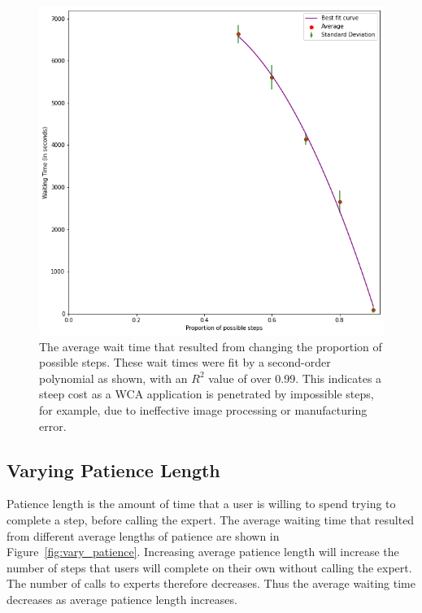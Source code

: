 \begin{figure}[H]
  \includegraphics[width=\textwidth]{figures/montecarlo/vary_success.png}
  \caption{
    The average wait time that resulted from changing the proportion of possible
    steps.
    These wait times were fit by a second-order polynomial as shown, with an
    $R^2$ value of over 0.99.
    This indicates a steep cost as a WCA application is penetrated by impossible
    steps, for example, due to ineffective image processing or manufacturing
    error.
  }\label{fig:vary_success}
\end{figure}

\subsection{Varying Patience Length}

Patience length is the amount of time that a user is willing to spend trying to
complete a step, before calling the expert.
The average waiting time that resulted from different average lengths of
patience are shown in Figure~\ref{fig:vary_patience}.
Increasing average patience length will increase the number of steps that users
will complete on their own without calling the expert.
The number of calls to experts therefore decreases.
Thus the average waiting time decreases as average patience length increases.

